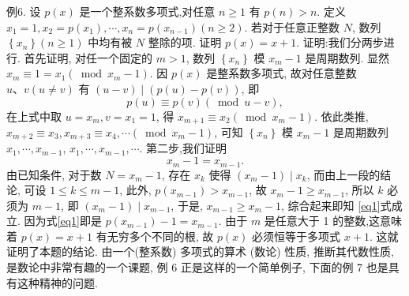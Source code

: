 例6. 设 $p(x)$ 是一个整系数多项式,对任意 $n \geqslant 1$ 有 $p(n)>n$. 定义 $x_1= 1, x_2=p\left(x_1\right), \cdots, x_n=p\left(x_{n-1}\right)(n \geqslant 2)$. 若对于任意正整数 $N$, 数列 $\left\{x_n\right\}(n \geqslant 1)$ 中均有被 $N$ 整除的项.
证明 $p(x)=x+1$.
证明:我们分两步进行.
首先证明, 对任一个固定的 $m>1$, 数列 $\left\{x_n\right\}$ 模 $x_m-1$ 是周期数列.
显然 $x_m \equiv 1=x_1\left(\bmod x_m-1\right)$. 因 $p(x)$ 是整系数多项式, 故对任意整数 $u 、 v(u \neq v)$ 有 $(u-v) \mid(p(u)-p(v))$, 即
$$
p(u) \equiv p(v)(\bmod u-v),
$$
在上式中取 $u=x_m, v=x_1=1$, 得 $x_{m+1} \equiv x_2\left(\bmod x_m-1\right)$. 依此类推, $x_{m+2} \equiv x_3, x_{m+3} \equiv x_4, \cdots\left(\bmod x_m-1\right)$, 可知 $\left\{x_n\right\}$ 模 $x_m-1$ 是周期数列 $x_1, \cdots, x_{m-1}$, $x_1, \cdots, x_{m-1}, \cdots$.
第二步,我们证明
$$
x_m-1=x_{m-1} . \label{eq1}
$$
由已知条件, 对于数 $N=x_m-1$, 存在 $x_k$ 使得 $\left(x_m-1\right) \mid x_k$, 而由上一段的结论, 可设 $1 \leqslant k \leqslant m-1$, 此外, $p\left(x_{m-1}\right)>x_{m-1}$, 故 $x_m-1 \geqslant x_{m-1}$, 所以 $k$ 必须为 $m-1$, 即 $\left(x_m-1\right) \mid x_{m-1}$, 于是, $x_{m-1} \geqslant x_m-1$, 综合起来即知 \ref{eq1}式成立.
因为式\ref{eq1}即是 $p\left(x_{m-1}\right)-1=x_{m-1}$. 由于 $m$ 是任意大于 1 的整数,这意味着 $p(x)=x+1$ 有无穷多个不同的根, 故 $p(x)$ 必须恒等于多项式 $x+1$. 这就证明了本题的结论.
由一个(整系数) 多项式的算术 (数论) 性质, 推断其代数性质, 是数论中非常有趣的一个课题, 例 6 正是这样的一个简单例子, 下面的例 7 也是具有这种精神的问题.



